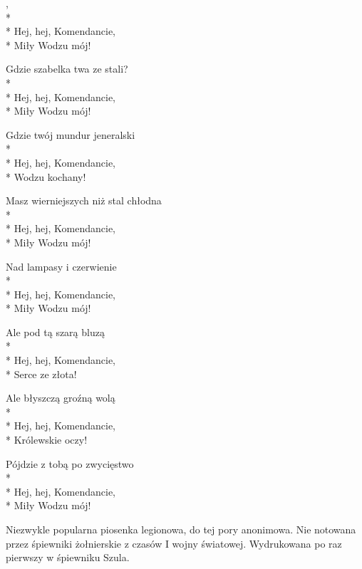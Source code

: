 \begin{lyrics}[longestline={Masz wierniejszych niż stal chłodna}]

,\\*
\\*
Hej, hej, Komendancie,\\*
Miły Wodzu mój!

Gdzie szabelka twa ze stali?\\*
\\*
Hej, hej, Komendancie,\\*
Miły Wodzu mój!

Gdzie twój mundur jeneralski\\*
\\*
Hej, hej, Komendancie,\\*
Wodzu kochany!

Masz wierniejszych niż stal chłodna\\*
\\*
Hej, hej, Komendancie,\\*
Miły Wodzu mój!

Nad lampasy i czerwienie\\*
\\*
Hej, hej, Komendancie,\\*
Miły Wodzu mój!

Ale pod tą szarą bluzą\\*
\\*
Hej, hej, Komendancie,\\*
Serce ze złota!

Ale błyszczą groźną wolą\\*
\\*
Hej, hej, Komendancie,\\*
Królewskie oczy!

Pójdzie z tobą po zwycięstwo\\*
\\*
Hej, hej, Komendancie,\\*
Miły Wodzu mój!
\end{lyrics}



\begin{info}Niezwykle popularna piosenka legionowa, do tej pory anonimowa. Nie notowana przez śpiewniki żołnierskie z czasów I wojny światowej. Wydrukowana po raz pierwszy w śpiewniku Szula.\end{info}

